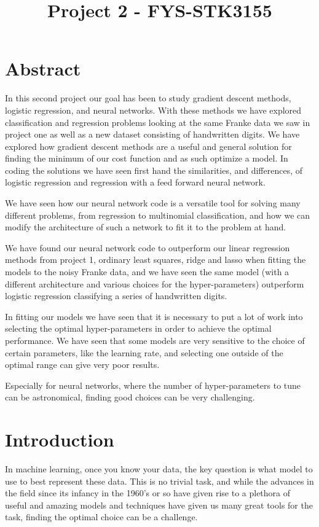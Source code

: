 \documentclass[11pt]{article}
\title{Project 2 - FYS-STK3155}
\begin{document}
    
    \maketitle
    
    

    
    \hypertarget{abstract}{%
\section{Abstract}\label{abstract}}
In this second project our goal has been to study gradient descent methods, logistic regression, and neural networks. With these methods we have explored classification and regression problems looking at the same Franke data we saw in project one as well as a new dataset consisting of handwritten digits. We have explored how gradient descent methods are a useful and general solution for finding the minimum of our cost function and as such optimize a model. In coding the solutions we have seen first hand the similarities, and differences, of logistic regression and regression with a feed forward neural network.

We have seen how our neural network code is a versatile tool for solving many different problems, from regression to multinomial classification, and how we can modify the architecture of such a network to fit it to the problem at hand. 

We have found our neural network code to outperform our linear regression methods from project 1, ordinary least squares, ridge and lasso when fitting the models to the noisy Franke data, and we have seen the same model (with a different architecture and various choices for the hyper-parameters) outperform logistic regression classifying a series of handwritten digits.

In fitting our models we have seen that it is necessary to put a lot of work into selecting the optimal hyper-parameters in order to achieve the optimal performance. We have seen that some models are very sensitive to the choice of certain parameters, like the learning rate, and selecting one outside of the optimal range can give very poor results. 

Especially for neural networks, where the number of hyper-parameters to tune can be astronomical, finding good choices can be very challenging. 


    \hypertarget{introduction}{%
\section{Introduction}\label{introduction}}
In machine learning, once you know your data, the key question is what model to use to best represent these data. This is no trivial task, and while the advances in the field since its infancy in the 1960's or so have given rise to a plethora of useful and amazing models and techniques have given us many great tools for the task, finding the optimal choice can be a challenge.
\end{document}
